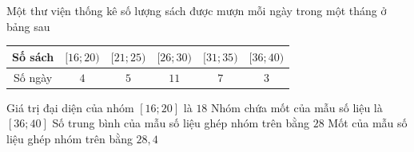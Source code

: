 \begin{ex}%
	Một thư viện thống kê số lượng sách  được mượn mỗi ngày trong một tháng ở bảng sau
	\begin{center}
		\begin{tabular}{|c|c|c|c|c|c|}
			\hline 
			Số sách & $ [16;20) $ &$ [21;25) $  & $ [26;30) $ & $ [31;35) $ & $ [36;40) $ \\
			 \hline
			 Số ngày & $ 4 $ & $ 5 $ & $ 11 $ & $ 7 $ & $ 3 $ \\
			 \hline
		\end{tabular}
	\end{center}
	\choiceTF 
		{\True Giá trị đại diện của nhóm $[16;20]$ là $ 18 $} 
		{Nhóm chứa mốt của mẫu  số liệu là $[36;40]$}
		{\True Số trung bình của mẫu số  liệu ghép nhóm trên bằng $28$}
		{\True Mốt của mẫu số liệu ghép nhóm  trên bằng $28{,}4$}
\end{ex}

